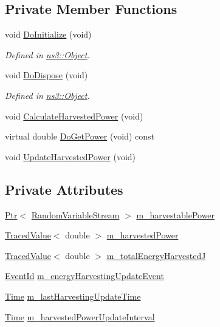 \subsection*{Private Member Functions}
\begin{DoxyCompactItemize}
\item 
void \hyperlink{classns3_1_1BasicEnergyHarvester_afac6df462e0e60f32b09cdbd0c6daef8}{Do\+Initialize} (void)
\begin{DoxyCompactList}\small\item\em Defined in \hyperlink{classns3_1_1Object}{ns3\+::\+Object}. \end{DoxyCompactList}\item 
void \hyperlink{classns3_1_1BasicEnergyHarvester_a49923ef69cc33e26c432c7e978aefe38}{Do\+Dispose} (void)
\begin{DoxyCompactList}\small\item\em Defined in \hyperlink{classns3_1_1Object}{ns3\+::\+Object}. \end{DoxyCompactList}\item 
void \hyperlink{classns3_1_1BasicEnergyHarvester_ad48bc7cd5f890783a23bdc64d38704d3}{Calculate\+Harvested\+Power} (void)
\item 
virtual double \hyperlink{classns3_1_1BasicEnergyHarvester_acc146a56589cc8be80c0dbb5f0431347}{Do\+Get\+Power} (void) const 
\item 
void \hyperlink{classns3_1_1BasicEnergyHarvester_aa1a0d934e9024f469a6b06b3b960f34e}{Update\+Harvested\+Power} (void)
\end{DoxyCompactItemize}
\subsection*{Private Attributes}
\begin{DoxyCompactItemize}
\item 
\hyperlink{classns3_1_1Ptr}{Ptr}$<$ \hyperlink{classns3_1_1RandomVariableStream}{Random\+Variable\+Stream} $>$ \hyperlink{classns3_1_1BasicEnergyHarvester_a0db55946a8ce3ff8a854754e26bc26ba}{m\+\_\+harvestable\+Power}
\item 
\hyperlink{classns3_1_1TracedValue}{Traced\+Value}$<$ double $>$ \hyperlink{classns3_1_1BasicEnergyHarvester_a0ba39c8a284e81584ab5af5ccdc3e898}{m\+\_\+harvested\+Power}
\item 
\hyperlink{classns3_1_1TracedValue}{Traced\+Value}$<$ double $>$ \hyperlink{classns3_1_1BasicEnergyHarvester_a87500c5e34a0f4cf246b20bd7b25a3d0}{m\+\_\+total\+Energy\+HarvestedJ}
\item 
\hyperlink{classns3_1_1EventId}{Event\+Id} \hyperlink{classns3_1_1BasicEnergyHarvester_abb6206e5618287f67c20100848e617f8}{m\+\_\+energy\+Harvesting\+Update\+Event}
\item 
\hyperlink{classns3_1_1Time}{Time} \hyperlink{classns3_1_1BasicEnergyHarvester_a05e614b07099c9b9708ba070ac32e109}{m\+\_\+last\+Harvesting\+Update\+Time}
\item 
\hyperlink{classns3_1_1Time}{Time} \hyperlink{classns3_1_1BasicEnergyHarvester_af7c4045894b090b4f89d10ba9aa2553b}{m\+\_\+harvested\+Power\+Update\+Interval}
\end{DoxyCompactItemize}

